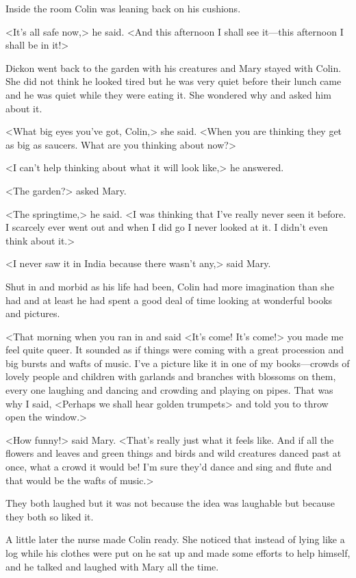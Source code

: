 Inside the room Colin was leaning back on his cushions.

<It's all safe now,> he said. <And this afternoon I shall see it—this afternoon I shall be in it!>

Dickon went back to the garden with his creatures and Mary stayed with Colin. She did not think he looked tired but he was very quiet before their lunch came and he was quiet while they were eating it. She wondered why and asked him about it.

<What big eyes you've got, Colin,> she said. <When you are thinking they get as big as saucers. What are you thinking about now?>

<I can't help thinking about what it will look like,> he answered.

<The garden?> asked Mary.

<The springtime,> he said. <I was thinking that I've really never seen it before. I scarcely ever went out and when I did go I never looked at it. I didn't even think about it.>

<I never saw it in India because there wasn't any,> said Mary.

Shut in and morbid as his life had been, Colin had more imagination than she had and at least he had spent a good deal of time looking at wonderful books and pictures.

<That morning when you ran in and said <It's come! It's come!> you made me feel quite queer. It sounded as if things were coming with a great procession and big bursts and wafts of music. I've a picture like it in one of my books—crowds of lovely people and children with garlands and branches with blossoms on them, every one laughing and dancing and crowding and playing on pipes. That was why I said, <Perhaps we shall hear golden trumpets> and told you to throw open the window.>

<How funny!> said Mary. <That's really just what it feels like. And if all the flowers and leaves and green things and birds and wild creatures danced past at once, what a crowd it would be! I'm sure they'd dance and sing and flute and that would be the wafts of music.>

They both laughed but it was not because the idea was laughable but because they both so liked it.

A little later the nurse made Colin ready. She noticed that instead of lying like a log while his clothes were put on he sat up and made some efforts to help himself, and he talked and laughed with Mary all the time.


